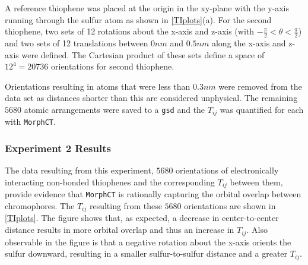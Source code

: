 A reference thiophene was placed at the origin in the xy-plane
with the y-axis running through the sulfur atom as shown in \autoref{TIplots}(a). For the second thiophene,
two sets of 12 rotations about the x-axis and z-axis (with $- \frac{\pi}{2} < \theta< \frac{\pi}{2}$)
and two sets of 12 translations between $0nm$ and $0.5nm$ along the x-axis and z-axis were defined.
The Cartesian product of these sets define a space of $12^{4}= 20736$ orientations for second thiophene. 

Orientations resulting in atoms that were less
than $0.3nm$ were removed from the data set as distances shorter than this are considered
unphysical. The remaining $5680$ atomic arrangements were saved to a \texttt{gsd} and the $T_{ij}$ was quantified for
each with \texttt{MorphCT}. 

\subsubsection{Experiment 2 Results}

The data resulting from this experiment, $5680$ orientations of electronically 
interacting non-bonded thiophenes and the
corresponding $T_{ij}$ between them, provide evidence that \texttt{MorphCT} is rationally capturing the orbital
overlap between chromophores. 
The $T_{ij}$ resulting from these $5680$ orientations are shown in \autoref{TIplots}. 
The figure shows that, as expected, a decrease in 
center-to-center distance results in more orbital overlap and thus an increase in $T_{ij}$. 
Also observable in the figure is that
a negative rotation about the x-axis orients the sulfur downward, resulting in a smaller sulfur-to-sulfur distance 
and a greater $T_{ij}$. 

